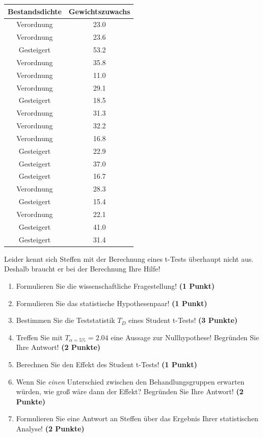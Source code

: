 \documentclass[a4paper, 9pt]{scrartcl}\usepackage[]{graphicx}\usepackage[]{xcolor}
\begin{document}
\begin{table}[!h]
\centering
\begin{tabular}{cc}
\toprule
Bestandsdichte & Gewichtszuwachs\\
\midrule
Verordnung & 23.0\\
Verordnung & 23.6\\
Gesteigert & 53.2\\
Verordnung & 35.8\\
Verordnung & 11.0\\
\addlinespace
Verordnung & 29.1\\
Gesteigert & 18.5\\
Verordnung & 31.3\\
Verordnung & 32.2\\
Verordnung & 16.8\\
\addlinespace
Gesteigert & 22.9\\
Gesteigert & 37.0\\
Gesteigert & 16.7\\
Verordnung & 28.3\\
Gesteigert & 15.4\\
\addlinespace
Verordnung & 22.1\\
Gesteigert & 41.0\\
Gesteigert & 31.4\\
\bottomrule
\end{tabular}
\end{table}



Leider kennt sich Steffen mit der Berechnung eines t-Tests überhaupt nicht aus. Deshalb braucht er bei der Berechnung Ihre Hilfe!

\begin{enumerate}
  \item Formulieren Sie die wissenschaftliche Fragestellung! \textbf{(1 Punkt)}
  \item Formulieren Sie das statistische Hypothesenpaar! \textbf{(1 Punkt)}
  \item Bestimmen Sie die Teststatistik $T_{D}$ eines Student t-Tests! \textbf{(3 Punkte)}
\item Treffen Sie mit $T_{\alpha = 5\%} = 2.04$ eine Aussage zur Nullhypothese! Begründen Sie Ihre Antwort! \textbf{(2 Punkte)}
\item Berechnen Sie den Effekt des Student t-Tests! \textbf{(1 Punkt)}
\item Wenn Sie \textit{einen} Unterschied zwischen den Behandlungsgruppen erwarten würden, wie groß wäre dann der Effekt? Begründen Sie Ihre Antwort! \textbf{(2 Punkte)}
\item Formulieren Sie eine Antwort an Steffen über das Ergebnis Ihrer statistischen Analyse! \textbf{(2 Punkte)}
\end{enumerate} 
\clearpage
\end{document}

